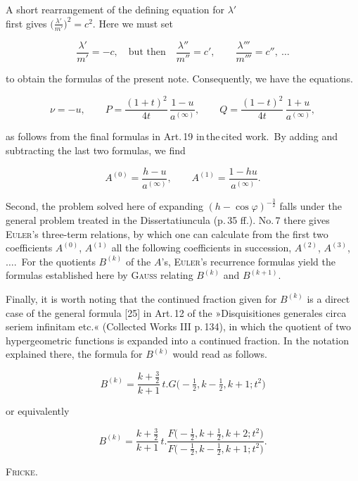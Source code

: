 %
\noindent A short rearrangement of the defining equation for $\lambda'$\hfill\\
first gives \mbox{$\bigl(\frac{\lambda'}{m'}\bigr)^{2}=c^{2}$}. Here we must set

\[
\frac{\lambda'}{m'}=-c,\quad\text{but then}\quad
\frac{\lambda''}{m''}=c',\qquad \frac{\lambda'''}{m'''}=c'',\ \ldots
\]

\noindent to obtain the formulas of the present note. Consequently, we have the
equations.

\[
\nu=-u,\qquad P=\frac{(1+t)^{2}}{4t}\,\frac{1-u}{a^{(\infty)}},\qquad
Q=\frac{(1-t)^{2}}{4t}\,\frac{1+u}{a^{(\infty)}},
\]

\noindent as follows from the final formulas in Art.\,19 in\,the\,cited work.\ By adding and
subtracting the last two formulas, we find

\[
A^{(0)}=\frac{h-u}{a^{(\infty)}},\qquad A^{(1)}=\frac{1-hu}{a^{(\infty)}}.
\]

Second, the problem solved here of expanding
$(h-\cos\varphi)^{-\frac{3}{2}}$ falls under the general problem treated in the Dissertatiuncula (p.\,35 ff.).
No.\,7 there gives \textsc{Euler}'s three-term
relations, by which one can calculate from the first two coefficients
$A^{(0)}$, $A^{(1)}$ all the following coefficients in succession, $A^{(2)}$,
$A^{(3)}$, $\ldots$.\ For the quotients $B^{(k)}$ of the
$A$'s, \textsc{Euler}'s recurrence formulas yield the formulas established here by \textsc{Gauss}
relating $B^{(k)}$ and $B^{(k+1)}$.

Finally, it is worth noting that the continued fraction given for $B^{(k)}$
is a direct case of the general formula [25] in Art.\,12 of the »Disquisitiones
generales circa seriem infinitam etc.« (Collected Works III p.\,134), in which
the quotient of two hypergeometric functions is expanded into a continued fraction.
In the notation explained there, the formula for $B^{(k)}$
would read as follows.

\[
B^{(k)}=\frac{k+\frac{3}{2}}{k+1}\,t\mathord{.} G\bigl(-\tfrac{1}{2},k-\tfrac{1}{2},k+1;t^{2}\bigr)
\]

\noindent or equivalently

\[
B^{(k)}=\frac{k+\frac{3}{2}}{k+1}\,t\mathord{.}
\frac{F\bigl(-\tfrac{1}{2},k+\tfrac{1}{2},k+2;t^{2}\bigr)}{F\bigl(-\tfrac{1}{2},k-\tfrac{1}{2},k+1;t^{2}\bigr)}.
\]

\begin{flushright}
\textsc{Fricke.}
\end{flushright}
